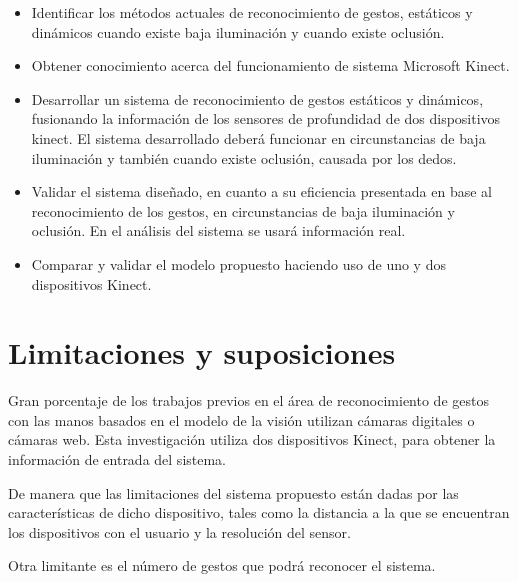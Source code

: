 \begin{itemize}
	\item Identificar los m\'etodos actuales de reconocimiento de gestos, estáticos y din\'amicos cuando existe baja iluminación  y cuando existe oclusión. 
	
	\item  Obtener conocimiento acerca del funcionamiento de sistema Microsoft Kinect.
	
	\item Desarrollar un sistema de reconocimiento de gestos estáticos y dinámicos, fusionando la información de los sensores de  profundidad de dos dispositivos kinect. El sistema desarrollado deberá funcionar en circunstancias de baja iluminación y también cuando existe oclusión, causada por los dedos. 
	
	\item Validar el sistema dise\~nado, en cuanto a su eficiencia presentada en base al reconocimiento de los gestos, en circunstancias de baja iluminación y oclusión. En el análisis del sistema se usar\'a información real.  
	
	\item Comparar y validar el modelo propuesto haciendo uso de uno y dos dispositivos Kinect. 
\end{itemize}




\section{Limitaciones y suposiciones}\label{sec:Limitaciones&Suposiciones}

Gran porcentaje de los trabajos previos en el \'area de reconocimiento de gestos con las manos basados en el modelo de la visión  utilizan c\'amaras digitales o c\'amaras web. Esta investigación utiliza dos dispositivos Kinect, para obtener la información de entrada del sistema.

De  manera que las limitaciones del sistema propuesto están dadas por las características de dicho dispositivo, tales como la distancia  a la que se encuentran los dispositivos con el usuario y la resolución del sensor. 

Otra limitante es el número de gestos que podrá reconocer el sistema.




